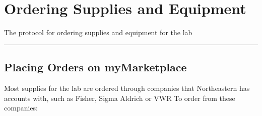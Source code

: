 \documentclass[
  letterpaper,
  DIV=11,
  numbers=noendperiod]{scrreprt}
\begin{document}
\hypertarget{ordering-supplies-and-equipment}{%
\chapter{Ordering Supplies and
Equipment}\label{ordering-supplies-and-equipment}}

The protocol for ordering supplies and equipment for the lab

\begin{center}\rule{0.5\linewidth}{0.5pt}\end{center}

\hypertarget{placing-orders-on-mymarketplace}{%
\section*{\texorpdfstring{\textbf{Placing Orders on
myMarketplace}}{Placing Orders on myMarketplace}}\label{placing-orders-on-mymarketplace}}


Most supplies for the lab are ordered through companies that
Northeastern has accounts with, such as Fisher, Sigma Aldrich or VWR To
order from these companies:
\end{document}
